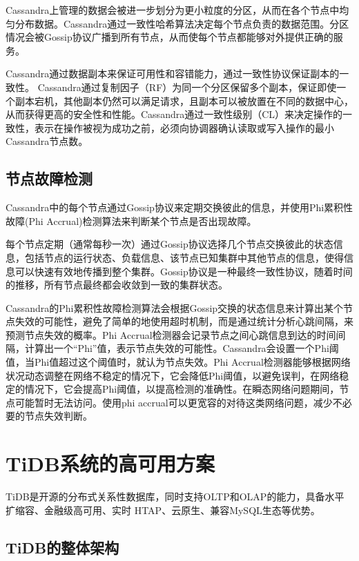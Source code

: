 Cassandra上管理的数据会被进一步划分为更小粒度的分区，从而在各个节点中均匀分布数据。Cassandra通过一致性哈希算法\cite{karger1997consistent}决定每个节点负责的数据范围。分区情况会被Gossip协议广播到所有节点，从而使每个节点都能够对外提供正确的服务。

Cassandra通过数据副本来保证可用性和容错能力，通过一致性协议保证副本的一致性。
Cassandra通过复制因子（RF）为同一个分区保留多个副本，保证即使一个副本宕机，其他副本仍然可以满足请求，且副本可以被放置在不同的数据中心，从而获得更高的安全性和性能。Cassandra通过一致性级别（CL）来决定操作的一致性，表示在操作被视为成功之前，必须向协调器确认读取或写入操作的最小Cassandra节点数。


\subsection{节点故障检测}

Cassandra中的每个节点通过Gossip协议来定期交换彼此的信息，并使用Phi累积性故障(Phi Accrual)检测算法\cite{hayashibara2004spl}来判断某个节点是否出现故障。

每个节点定期（通常每秒一次）通过Gossip协议选择几个节点交换彼此的状态信息，包括节点的运行状态、负载信息、该节点已知集群中其他节点的信息，使得信息可以快速有效地传播到整个集群。Gossip协议是一种最终一致性协议，随着时间的推移，所有节点最终都会收敛到一致的集群状态。

Cassandra的Phi累积性故障检测算法会根据Gossip交换的状态信息来计算出某个节点失效的可能性，避免了简单的地使用超时机制，而是通过统计分析心跳间隔，来预测节点失效的概率。Phi Accrual检测器会记录节点之间心跳信息到达的时间间隔，计算出一个“Phi”值，表示节点失效的可能性。Cassandra会设置一个Phi阈值，当Phi值超过这个阈值时，就认为节点失效。Phi Accrual检测器能够根据网络状况动态调整在网络不稳定的情况下，它会降低Phi阈值，以避免误判，在网络稳定的情况下，它会提高Phi阈值，以提高检测的准确性。在瞬态网络问题期间，节点可能暂时无法访问。使用phi accrual可以更宽容的对待这类网络问题，减少不必要的节点失效判断。


\section{TiDB系统的高可用方案}
TiDB\cite{huang2020tidb}是开源的分布式关系性数据库，同时支持OLTP和OLAP的能力，具备水平扩缩容、金融级高可用、实时 HTAP、云原生、兼容MySQL生态等优势。

\subsection{TiDB的整体架构}

